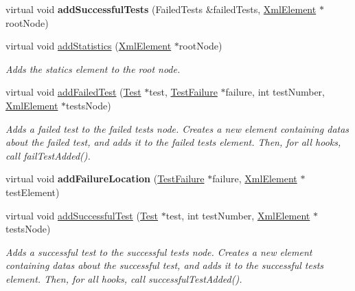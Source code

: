 \begin{DoxyCompactItemize}
\item 
virtual void {\bfseries add\+Successful\+Tests} (Failed\+Tests \&failed\+Tests, \hyperlink{class_xml_element}{Xml\+Element} $\ast$root\+Node)\hypertarget{class_xml_outputter_a57805372b9f3ceeafd43a1e637f8b888}{}\label{class_xml_outputter_a57805372b9f3ceeafd43a1e637f8b888}

\item 
virtual void \hyperlink{class_xml_outputter_a8ba291b109ac04b9f652c027c3318f14}{add\+Statistics} (\hyperlink{class_xml_element}{Xml\+Element} $\ast$root\+Node)
\begin{DoxyCompactList}\small\item\em Adds the statics element to the root node. \end{DoxyCompactList}\item 
virtual void \hyperlink{class_xml_outputter_abbe12c670f490cbe29b8be6d9ff174e6}{add\+Failed\+Test} (\hyperlink{class_test}{Test} $\ast$test, \hyperlink{class_test_failure}{Test\+Failure} $\ast$failure, int test\+Number, \hyperlink{class_xml_element}{Xml\+Element} $\ast$tests\+Node)\hypertarget{class_xml_outputter_abbe12c670f490cbe29b8be6d9ff174e6}{}\label{class_xml_outputter_abbe12c670f490cbe29b8be6d9ff174e6}

\begin{DoxyCompactList}\small\item\em Adds a failed test to the failed tests node. Creates a new element containing datas about the failed test, and adds it to the failed tests element. Then, for all hooks, call fail\+Test\+Added(). \end{DoxyCompactList}\item 
virtual void {\bfseries add\+Failure\+Location} (\hyperlink{class_test_failure}{Test\+Failure} $\ast$failure, \hyperlink{class_xml_element}{Xml\+Element} $\ast$test\+Element)\hypertarget{class_xml_outputter_a1afa9344722155ae8ea3d7d67493ade3}{}\label{class_xml_outputter_a1afa9344722155ae8ea3d7d67493ade3}

\item 
virtual void \hyperlink{class_xml_outputter_a025e0e041db1ec557e9af2887a24dd9e}{add\+Successful\+Test} (\hyperlink{class_test}{Test} $\ast$test, int test\+Number, \hyperlink{class_xml_element}{Xml\+Element} $\ast$tests\+Node)\hypertarget{class_xml_outputter_a025e0e041db1ec557e9af2887a24dd9e}{}\label{class_xml_outputter_a025e0e041db1ec557e9af2887a24dd9e}

\begin{DoxyCompactList}\small\item\em Adds a successful test to the successful tests node. Creates a new element containing datas about the successful test, and adds it to the successful tests element. Then, for all hooks, call successful\+Test\+Added(). \end{DoxyCompactList}\end{DoxyCompactItemize}
